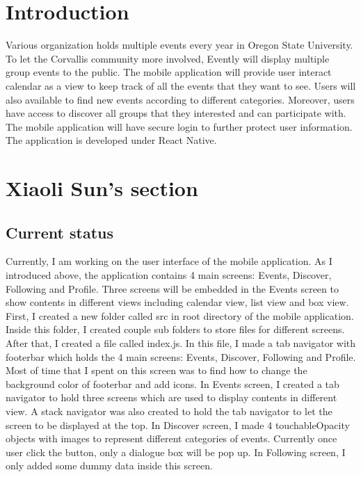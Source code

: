 \documentclass[letterpaper, 10pt,titlepage]{article}
\begin{document}
\section{Introduction}
Various organization holds multiple events every year in Oregon State University. To let the Corvallis community more involved, Evently will display multiple group events to the public. The mobile application will provide user interact calendar as a view to keep track of all the events that they want to see. Users will also available to find new events according to different categories. Moreover, users have access to discover all groups that they interested and can participate with. The mobile application will have secure login to further protect user information. The application is developed under React Native. 


\section{Xiaoli Sun's section}
\subsection{Current status}
Currently, I am working on the user interface of the mobile application. As I introduced above, the application contains 4 main screens: Events, Discover, Following and Profile. Three screens will be embedded in the Events screen to show contents in different views including calendar view, list view and box view. First, I created a new folder called src in root directory of the mobile application. Inside this folder, I created couple sub folders to store files for different screens. After that, I created a file called index.js. In this file, I made a tab navigator with footerbar which holds the 4 main screens: Events, Discover, Following and Profile. Most of time that I spent on this screen was to find how to change the background color of footerbar and add icons. In Events screen, I created a tab navigator to hold three screens which are used to display contents in different view. A stack navigator was also created to hold the tab navigator to let the screen to be displayed at the top. In Discover screen, I made 4 touchableOpacity objects with images to represent different categories of events. Currently once user click the button, only a dialogue box will be pop up. In Following screen, I only added some dummy data inside this screen. 
\end{document}
